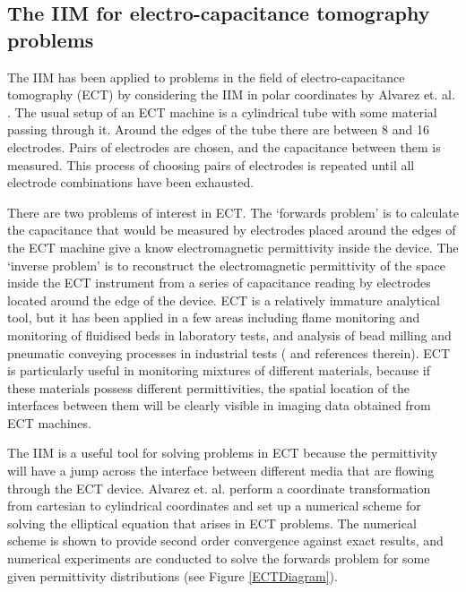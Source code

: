 \newpage

\subsection{The IIM for electro-capacitance tomography problems}
The IIM has been applied to problems in the field of electro-capacitance tomography (ECT) by considering the IIM in polar coordinates by Alvarez et. al. \cite{alvarezchenli11}.
The usual setup of an ECT machine is a cylindrical tube with some material passing through it.
Around the edges of the tube there are between 8 and 16 electrodes.
Pairs of electrodes are chosen, and the capacitance between them is measured.
This process of choosing pairs of electrodes is repeated until all electrode combinations have been exhausted.

There are two problems of interest in ECT.
The `forwards problem' is to calculate the capacitance that would be measured by electrodes placed around the edges of the ECT machine give a know electromagnetic permittivity inside the device.
The `inverse problem' is to reconstruct the electromagnetic permittivity of the space inside the ECT instrument from a series of capacitance reading by electrodes located around the edge of the device.
ECT is a relatively immature analytical tool, but it has been applied in a few areas including flame monitoring and monitoring of fluidised beds in laboratory tests, and analysis of bead milling and pneumatic conveying processes in industrial tests (\cite{york01} and references therein).
ECT is particularly useful in monitoring mixtures of different materials, because if these materials possess different permittivities, the spatial location of the interfaces between them will be clearly visible in imaging data obtained from ECT machines.

The IIM is a useful tool for solving problems in ECT because the permittivity will have a jump across the interface between different media that are flowing through the ECT device.
Alvarez et. al. \cite{alvarezchenli11} perform a coordinate transformation from cartesian to cylindrical coordinates and set up a numerical scheme for solving the elliptical equation that arises in ECT problems.
The numerical scheme is shown to provide second order convergence against exact results, and numerical experiments are conducted to solve the forwards problem for some given permittivity distributions (see Figure \ref{ECTDiagram}).

